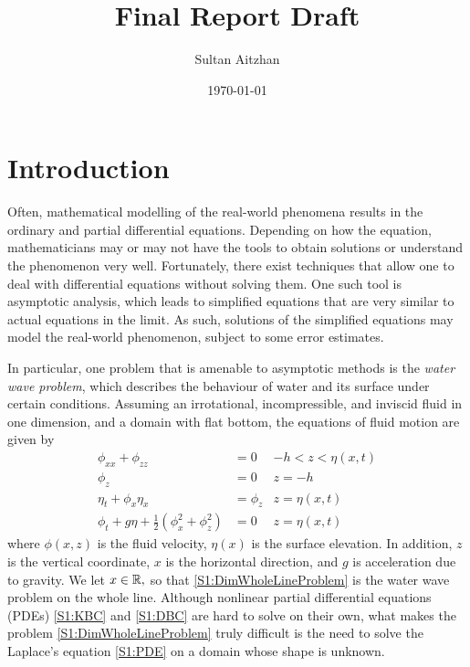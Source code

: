\documentclass[11pt,reqno,oneside,a4paper]{article}
\author{Sultan Aitzhan}
\title{Final Report Draft}
\date{\today}
\begin{document}
\maketitle
\thispagestyle{fancy}
\tableofcontents
\pagebreak

\section{Introduction}
Often, mathematical modelling of the real-world phenomena results in the ordinary and partial differential equations. Depending on how the equation, mathematicians may or may not have the tools to obtain solutions or understand the phenomenon very well. Fortunately, there exist techniques that allow one to deal with differential equations without solving them. One such tool is asymptotic analysis, which leads to simplified equations that are very similar to actual equations in the limit. As such, solutions of the simplified equations may model the real-world phenomenon, subject to some error estimates.

In particular, one problem that is amenable to asymptotic methods is the \textit{water wave problem}, which describes the behaviour of water and its surface under certain conditions. Assuming an irrotational, incompressible, and inviscid fluid in one dimension, and a domain with flat bottom, the equations of fluid motion are given by
\begin{subequations} \label{S1:DimWholeLineProblem}
\begin{align}
\phi_{xx} + \phi_{zz} &= 0 &-h < z < \eta(x,t) \label{S1:PDE}\\
\phi_{z} &= 0 &z = -h \label{S1:BBC}\\
\eta_t + \phi_{x}\eta_{x} &= \phi_{z} & z = \eta(x,t) \label{S1:KBC}\\
\phi_t + g\eta + \frac{1}{2}(\phi_{x}^2 + \phi_{z}^2) &= 0 &z = \eta(x,t) \label{S1:DBC}
\end{align}
\end{subequations}
where $\phi(x,z)$ is the fluid velocity, $\eta(x)$ is the surface elevation. In addition, $z$ is the vertical coordinate, $x$ is the horizontal direction, and $g$ is acceleration due to gravity. We let $x\in\mathbb R,$ so that \eqref{S1:DimWholeLineProblem} is the water wave problem on the whole line. Although nonlinear partial differential equations (PDEs) \eqref{S1:KBC} and \eqref{S1:DBC} are hard to solve on their own, what makes the problem \eqref{S1:DimWholeLineProblem} truly difficult is the need to solve the Laplace's equation \eqref{S1:PDE} on a domain whose shape is unknown. 
\end{document}
